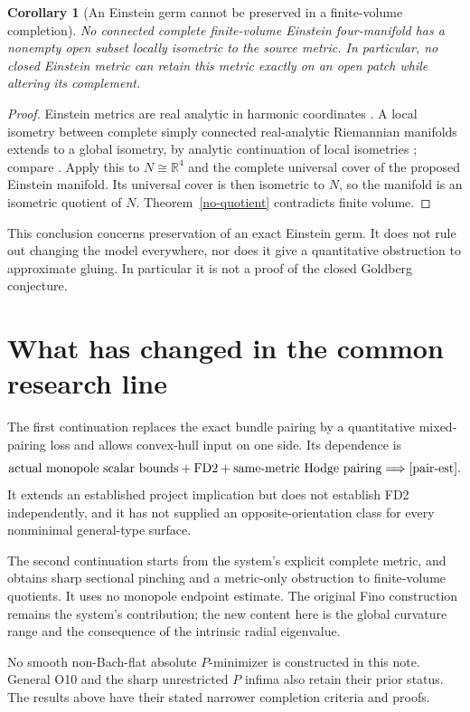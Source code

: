 \documentclass[11pt,a4paper]{article}
\newtheorem{corollary}[theorem]{Corollary}
\theoremstyle{definition}\newtheorem{assumption}[theorem]{Input}
\theoremstyle{remark}\newtheorem{remark}[theorem]{Remark}
\newcommand{\R}{\mathbb R}
\numberwithin{equation}{section}
\begin{document}
\begin{corollary}[An Einstein germ cannot be preserved in a finite-volume completion]\label{germ}
No connected complete finite-volume Einstein four-manifold has a nonempty open subset locally isometric to the source metric. In particular, no closed Einstein metric can retain this metric exactly on an open patch while altering its complement.
\end{corollary}
\begin{proof}
Einstein metrics are real analytic in harmonic coordinates \cite[Theorem 5.2]{DK}. A local isometry between complete simply connected real-analytic Riemannian manifolds extends to a global isometry, by analytic continuation of local isometries \cite[Chapter VI, Corollary 6.4]{KN}; compare \cite[Theorem 5.4]{DK}. Apply this to $N\cong\R^4$ and the complete universal cover of the proposed Einstein manifold. Its universal cover is then isometric to $N$, so the manifold is an isometric quotient of $N$. Theorem~\ref{no-quotient} contradicts finite volume.
\end{proof}

This conclusion concerns preservation of an exact Einstein germ. It does not rule out changing the model everywhere, nor does it give a quantitative obstruction to approximate gluing. In particular it is not a proof of the closed Goldberg conjecture.

\section{What has changed in the common research line}
The first continuation replaces the exact bundle pairing by a quantitative mixed-pairing loss and allows convex-hull input on one side. Its dependence is
\[
 \text{actual monopole scalar bounds}+\text{FD2}
 +\text{same-metric Hodge pairing}\Longrightarrow\eqref{pair-est}.
\]
It extends an established project implication but does not establish FD2 independently, and it has not supplied an opposite-orientation class for every nonminimal general-type surface.

The second continuation starts from the system's explicit complete metric, and obtains sharp sectional pinching and a metric-only obstruction to finite-volume quotients. It uses no monopole endpoint estimate. The original Fino construction remains the system's contribution; the new content here is the global curvature range and the consequence of the intrinsic radial eigenvalue.

No smooth non-Bach-flat absolute $P$-minimizer is constructed in this note. General O10 and the sharp unrestricted $P$ infima also retain their prior status. The results above have their stated narrower completion criteria and proofs.
\end{document}
